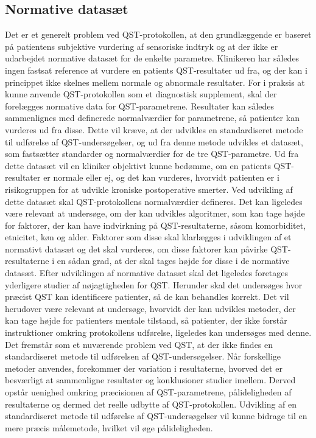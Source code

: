 \subsection{Normative datasæt} \label{Normativ_data} %
Det er et generelt problem ved QST-protokollen, at den grundlæggende er baseret på patientens subjektive vurdering af sensoriske indtryk og at der ikke er udarbejdet normative datasæt for de enkelte parametre. Klinikeren har således ingen fastsat reference at vurdere en patients QST-resultater ud fra, og der kan i princippet ikke skelnes mellem normale og abnormale resultater. For i praksis at kunne anvende QST-protokollen som et diagnostisk supplement, skal der forelægges normative data for QST-parametrene. Resultater kan således sammenlignes med definerede normalværdier for parametrene, så patienter kan vurderes ud fra disse. Dette vil kræve, at der udvikles en standardiseret metode til udførelse af QST-undersøgelser, og ud fra denne metode udvikles et datasæt, som fastsætter standarder og normalværdier for de tre QST-parametre. Ud fra dette datasæt vil en kliniker objektivt kunne bedømme, om en patients QST-resultater er normale eller ej, og det kan vurderes, hvorvidt patienten er i risikogruppen for at udvikle kroniske postoperative smerter. Ved udvikling af dette datasæt skal QST-protokollens normalværdier defineres. Det kan ligeledes være relevant at undersøge, om der kan udvikles algoritmer, som kan tage højde for faktorer, der kan have indvirkning på QST-resultaterne, såsom komorbiditet, etnicitet, køn og alder. Faktorer som disse skal klarlægges i udviklingen af et normativt datasæt og det skal vurderes, om disse faktorer kan påvirke QST-resultaterne i en sådan grad, at der skal tages højde for disse i de normative datasæt. Efter udviklingen af normative datasæt skal det ligeledes foretages yderligere studier af nøjagtigheden for QST. Herunder skal det undersøges hvor præcist QST kan identificere patienter, så de kan behandles korrekt.
Det vil herudover være relevant at undersøge, hvorvidt der kan udvikles metoder, der kan tage højde for patienters mentale tilstand, så patienter, der ikke forstår instruktioner omkring protokollens udførelse, ligeledes kan undersøges med denne. \\
Det fremstår som et nuværende problem ved QST, at der ikke findes en standardiseret metode til udførelsen af QST-undersøgelser. Når forskellige metoder anvendes, forekommer der variation i resultaterne, hvorved det er besværligt at sammenligne resultater og konklusioner studier imellem. Derved opstår uenighed omkring præcisionen af QST-parametrene, pålideligheden af resultaterne og dermed det reelle udbytte af QST-protokollen. Udvikling af en standardiseret metode til udførelse af QST-undersøgelser vil kunne bidrage til en mere præcis målemetode, hvilket vil øge pålideligheden.

